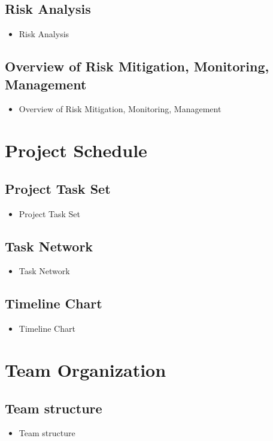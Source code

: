 \documentclass[oneside,a4paper,12pt]{book}
\begin{document}
\subsection{Risk Analysis}
\begin{itemize}
    \item Risk Analysis
\end{itemize}
\subsection{Overview of Risk Mitigation, Monitoring, Management}
\begin{itemize}
    \item Overview of Risk Mitigation, Monitoring, Management
\end{itemize}

\newpage
\section{Project Schedule}

\subsection{Project Task Set}
\begin{itemize}
    \item Project Task Set
\end{itemize}

\subsection{Task Network}
\begin{itemize}
    \item Task Network
\end{itemize}

\subsection{Timeline Chart}
\caption{Timeline Chart}
\begin{itemize}
    \item Timeline Chart
\end{itemize}

\section{Team Organization}

\subsection{Team structure}
\begin{itemize}
    \item Team structure
\end{itemize}
\end{document}
